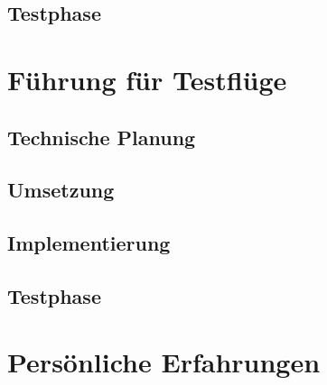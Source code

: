 	\subsection{Testphase}

\section{Führung für Testflüge}

	\subsection{Technische Planung}

	\subsection{Umsetzung}

	\subsection{Implementierung}

	\subsection{Testphase}

\section{Persönliche Erfahrungen}